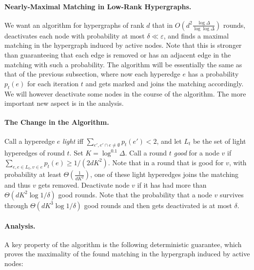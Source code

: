 \documentclass[11pt]{article}
\newcommand{\eps}{\varepsilon}
\begin{document}
\paragraph{Nearly-Maximal Matching in Low-Rank Hypergraphs.} We want an algorithm for hypergraphs of rank $d$ that in $O(d^2 \frac{\log \Delta}{\log\log \Delta})$ rounds, deactivates each node with probability at most $\delta \ll \eps$, and finds a maximal matching in the hypergraph induced by active nodes. Note that this is stronger than guaranteeing that each edge is removed or has an adjacent edge in the matching with such a probability. The algorithm will be essentially the same as that of the previous subsection, where now each hyperedge $e$ has a probability $p_{t}(e)$ for each iteration $t$ and gets marked and joins the matching accordingly. We will however deactivate some nodes in the course of the algorithm. The more important new aspect is in the analysis.

\paragraph{The Change in the Algorithm.} Call a hyperedge $e$ \emph{light} iff $\sum_{e', e'\cap e\neq\emptyset} p_{t}(e') < 2$, and let $L_t$ be the set of light hyperedges of round $t$. Set $K=\log^{0.1}\Delta$. Call a round $t$ \emph{good} for a node $v$ if $\sum_{e, e\in L_t, v\in e} p_{t}(e) \geq 1/(2dK^2)$. Note that in a round that is good for $v$, with probability at least $\Theta(\frac{1}{dK^2})$, one of these light hyperedges joins the matching and thus $v$ gets removed. Deactivate node $v$ if it has had more than $\Theta(dK^2 \log 1/\delta)$ good rounds. Note that the probability that a node $v$ survives through $\Theta(dK^3\log 1/\delta)$ good rounds and then gets deactivated is at most $\delta$.

\paragraph{Analysis.} A key property of the algorithm is the following deterministic guarantee, which proves the maximality of the found matching in the hypergraph induced by active nodes:
\end{document}
